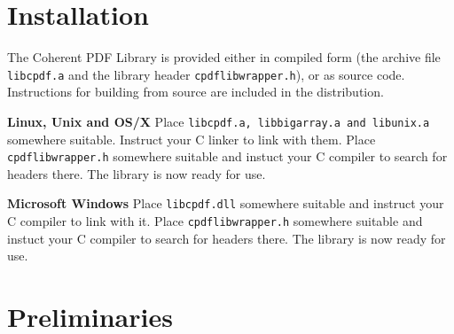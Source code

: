 \documentclass[a4paper]{memoir}
\begin{document}
\chapter*{Installation}
The Coherent PDF Library is provided either in compiled form (the archive file \texttt{libcpdf.a} and the library header \texttt{cpdflibwrapper.h}), or as source code. Instructions for building from source are included in the distribution.

\textbf{Linux, Unix and OS/X} Place \texttt{libcpdf.a, libbigarray.a and libunix.a} somewhere suitable. Instruct your C linker to link with them. Place \texttt{cpdflibwrapper.h} somewhere suitable and instuct your C compiler to search for headers there. \noindent The library is now ready for use.

\textbf{Microsoft Windows} Place \texttt{libcpdf.dll} somewhere suitable and instruct your C compiler to link with it. Place \texttt{cpdflibwrapper.h} somewhere suitable and instuct your C compiler to search for headers there. \noindent The library is now ready for use.

\setcounter{chapter}{-1}
\chapter{Preliminaries}
\end{document}
